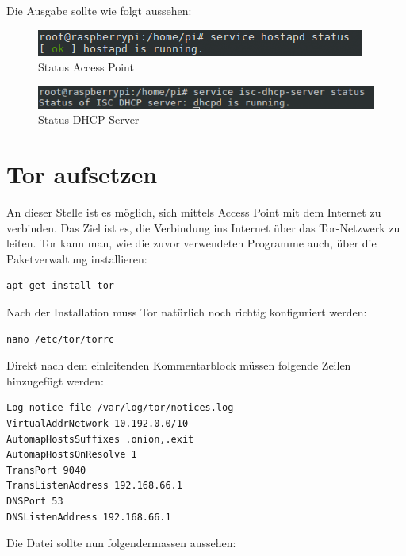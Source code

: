 Die Ausgabe sollte wie folgt aussehen: 

\begin{figure}[h]
\centering
\includegraphics[scale=0.7]{images/hostapd_status}
\caption{Status Access Point}
\end{figure}

\begin{figure}[h]
\centering
\includegraphics[scale=0.7]{images/dhcp_status}
\caption{Status DHCP-Server}
\end{figure}

\section{Tor aufsetzen}
An dieser Stelle ist es möglich, sich mittels Access Point mit dem Internet zu verbinden. Das Ziel ist es, die Verbindung ins Internet über das Tor-Netzwerk zu leiten. Tor kann man, wie die zuvor verwendeten Programme auch, über die Paketverwaltung installieren:

\begin{lstlisting}
apt-get install tor
\end{lstlisting}

Nach der Installation muss Tor natürlich noch richtig konfiguriert werden: 

\begin{lstlisting}
nano /etc/tor/torrc
\end{lstlisting} 

Direkt nach dem einleitenden Kommentarblock müssen folgende Zeilen hinzugefügt werden:

\begin{lstlisting}
Log notice file /var/log/tor/notices.log
VirtualAddrNetwork 10.192.0.0/10
AutomapHostsSuffixes .onion,.exit
AutomapHostsOnResolve 1
TransPort 9040
TransListenAddress 192.168.66.1
DNSPort 53
DNSListenAddress 192.168.66.1
\end{lstlisting}

Die Datei sollte nun folgendermassen aussehen: 

